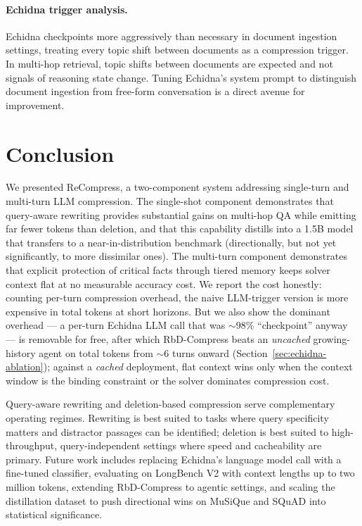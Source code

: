 \documentclass{article}
\begin{document}
\paragraph{Echidna trigger analysis.}
Echidna checkpoints more aggressively than necessary in document
ingestion settings, treating every topic shift between documents as a
compression trigger. In multi-hop retrieval, topic shifts between
documents are expected and not signals of reasoning state change. Tuning
Echidna's system prompt to distinguish document ingestion from free-form
conversation is a direct avenue for improvement.


\section{Conclusion}

We presented ReCompress, a two-component system addressing single-turn
and multi-turn LLM compression. The single-shot component demonstrates
that query-aware rewriting provides substantial gains on multi-hop QA
while emitting far fewer tokens than deletion, and that this capability
distills into a 1.5B model that transfers to a near-in-distribution benchmark
(directionally, but not yet significantly, to more dissimilar ones). The
multi-turn component demonstrates that explicit protection of critical facts
through tiered memory keeps solver context flat at no measurable accuracy cost.
We report the cost honestly: counting per-turn compression overhead, the naive
LLM-trigger version is more expensive in total tokens at short horizons. But we
also show the dominant overhead --- a per-turn Echidna LLM call that was
$\sim$98\% ``checkpoint'' anyway --- is removable for free, after which
RbD-Compress beats an \emph{uncached} growing-history agent on total tokens from
$\sim$6 turns onward (Section~\ref{sec:echidna-ablation}); against a
\emph{cached} deployment, flat context wins only when the context window is the
binding constraint or the solver dominates compression cost.

Query-aware rewriting and deletion-based compression serve complementary
operating regimes. Rewriting is best suited to tasks where query
specificity matters and distractor passages can be identified; deletion
is best suited to high-throughput, query-independent settings where
speed and cacheability are primary. Future work includes replacing
Echidna's language model call with a fine-tuned classifier, evaluating
on LongBench V2 with context lengths up to two million tokens, extending
RbD-Compress to agentic settings, and scaling the distillation dataset
to push directional wins on MuSiQue and SQuAD into statistical
significance.
\end{document}
